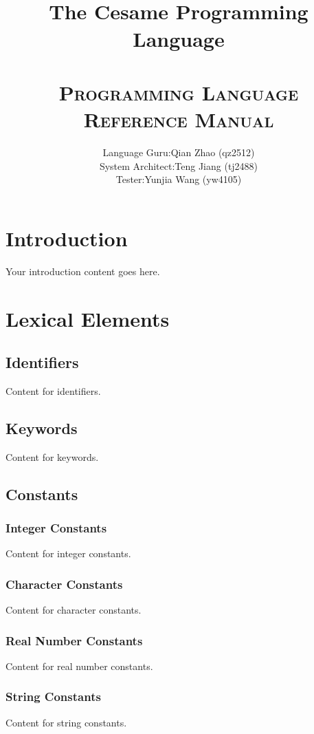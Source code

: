\documentclass[11pt,A4]{article}
\title{
    \normalfont \LARGE
    \horrule{1pt} \\[0.4cm] 
    \huge The Cesame Programming Language \\
    \horrule{1pt} \\[0.6cm] 
    \textsc{Programming Language Reference Manual} \\ [25pt]
}
\author{
   \begin{tabular}{ll}
       Language Guru: & Qian Zhao (qz2512) \\[5pt]
       System Architect: & Teng Jiang (tj2488) \\[5pt]
       Tester: & Yunjia Wang (yw4105)
   \end{tabular}
}
\date{}
\begin{document}
    \maketitle
    \thispagestyle{plain}
    \newpage
    
    \tableofcontents
    
    \newpage
    \section{Introduction}
    Your introduction content goes here.

    \newpage
    \section{Lexical Elements}
    
        \subsection{Identifiers}
        Content for identifiers.
        
        \subsection{Keywords}
        Content for keywords.
        
        \subsection{Constants}
            \subsubsection{Integer Constants}
            Content for integer constants.
            
            \subsubsection{Character Constants}
            Content for character constants.
        
            \subsubsection{Real Number Constants}
            Content for real number constants.
            
            \subsubsection{String Constants}
            Content for string constants.
        
\end{document}
